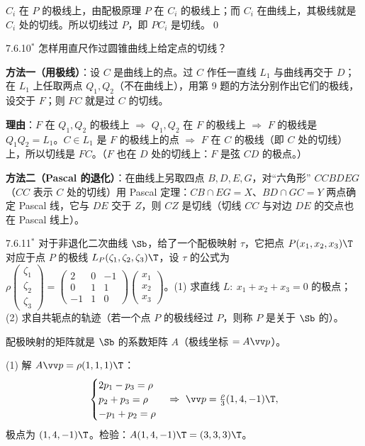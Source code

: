 $C_i$ 在 $P$ 的极线上，由配极原理 $P$ 在 $C_i$ 的极线上；而 $C_i$ 在曲线上，其极线就是 $C_i$ 处的切线。所以切线过 $P$，即 $PC_i$ 是切线。\qed

\begin{ex}{7.6.10$^*$}
怎样用直尺作过圆锥曲线上给定点的切线？
\end{ex}
\jie\textbf{方法一（用极线）}：设 $C$ 是曲线上的点。过 $C$ 作任一直线 $L_1$ 与曲线再交于 $D$；在 $L_1$ 上任取两点 $Q_1,Q_2$（不在曲线上），用第 9 题的方法分别作出它们的极线，设交于 $F$；则 $FC$ 就是过 $C$ 的切线。

\textbf{理由}：$F$ 在 $Q_1,Q_2$ 的极线上 $\Rightarrow$ $Q_1,Q_2$ 在 $F$ 的极线上 $\Rightarrow$ $F$ 的极线是 $Q_1Q_2=L_1$。$C\in L_1$ 是 $F$ 的极线上的点 $\Rightarrow$ $F$ 在 $C$ 的极线（即 $C$ 处的切线）上，所以切线是 $FC$。（$F$ 也在 $D$ 处的切线上：$F$ 是弦 $CD$ 的极点。）

\textbf{方法二（Pascal 的退化）}：在曲线上另取四点 $B,D,E,G$，对“六角形” $CCBDEG$（$CC$ 表示 $C$ 处的切线）用 Pascal 定理：$CB\cap EG=X$、$BD\cap GC=Y$ 两点确定 Pascal 线，它与 $DE$ 交于 $Z$，则 $CZ$ 是切线（切线 $CC$ 与对边 $DE$ 的交点也在 Pascal 线上）。

\begin{ex}{7.6.11$^*$}
对于非退化二次曲线 $\Sb$，给了一个配极映射 $\tau$，它把点 $P(x_1,x_2,x_3)\T$ 对应于点 $P$ 的极线 $L_P(\zeta_1,\zeta_2,\zeta_3)\T$，设 $\tau$ 的公式为
$\rho\begin{pmatrix}\zeta_1\\\zeta_2\\\zeta_3\end{pmatrix}=\begin{pmatrix}2&0&-1\\0&1&1\\-1&1&0\end{pmatrix}\begin{pmatrix}x_1\\x_2\\x_3\end{pmatrix}$。(1) 求直线 $L:\ x_1+x_2+x_3=0$ 的极点；(2) 求自共轭点的轨迹（若一个点 $P$ 的极线经过 $P$，则称 $P$ 是关于 $\Sb$ 的）。
\end{ex}
\jie 配极映射的矩阵就是 $\Sb$ 的系数矩阵 $A$（极线坐标 $=A\vv p$）。

(1) 解 $A\vv p=\rho(1,1,1)\T$：
\[
\begin{cases}2p_1-p_3=\rho\\p_2+p_3=\rho\\-p_1+p_2=\rho\end{cases}\Rightarrow\ \vv p=\tfrac\rho3(1,4,-1)\T,
\]
极点为 $(1,4,-1)\T$。检验：$A(1,4,-1)\T=(3,3,3)\T$。\checkmark

